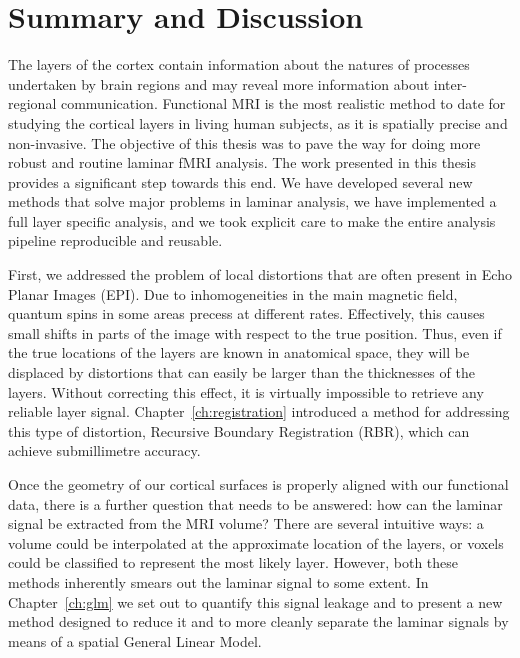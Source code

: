 
\chapter{Summary and Discussion}
\label{ch:discussion}

The layers of the cortex contain information about the natures of processes undertaken by brain regions and may reveal more information about inter-regional communication. Functional MRI is the most realistic method to date for studying the cortical layers in living human subjects, as it is spatially precise and non-invasive. The objective of this thesis was to pave the way for doing more robust and routine laminar fMRI analysis. The work presented in this thesis provides a significant step towards this end. We have developed several new methods that solve major problems in laminar analysis, we have implemented a full layer specific analysis, and we took explicit care to make the entire analysis pipeline reproducible and reusable.

First, we addressed the problem of local distortions that are often present in Echo Planar Images (EPI). Due to inhomogeneities in the main magnetic field, quantum spins in some areas precess at different rates. Effectively, this causes small shifts in parts of the image with respect to the true position. Thus, even if the true locations of the layers are known in anatomical space, they will be displaced by distortions that can easily be larger than the thicknesses of the layers. Without correcting this effect, it is virtually impossible to retrieve any reliable layer signal. Chapter~\ref{ch:registration} introduced a method for addressing this type of distortion, Recursive Boundary Registration (RBR), which can achieve submillimetre accuracy.

Once the geometry of our cortical surfaces is properly aligned with our functional data, there is a further question that needs to be answered: how can the laminar signal be extracted from the MRI volume? There are several intuitive ways: a volume could be interpolated at the approximate location of the layers, or voxels could be classified to represent the most likely layer. However, both these methods inherently smears out the laminar signal to some extent. In Chapter~\ref{ch:glm} we set out to quantify this signal leakage and to present a new method designed to reduce it and to more cleanly separate the laminar signals by means of a spatial General Linear Model.

